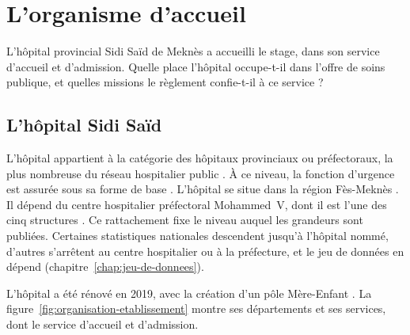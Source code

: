 
\chapter{L'organisme d'accueil}\label{chap:organisme}

L'hôpital provincial Sidi Saïd de Meknès a accueilli le stage, dans son service d'accueil et
d'admission. Quelle place l'hôpital occupe-t-il dans l'offre de soins publique, et quelles missions
le règlement confie-t-il à ce service ?

\section{L'hôpital Sidi Saïd}

L'hôpital appartient à la catégorie des hôpitaux provinciaux ou préfectoraux, la plus nombreuse du
réseau hospitalier public \cite[tableau~32, p.~46]{s30}. À ce niveau, la fonction d'urgence est
assurée sous sa forme de base \cite{s12}. L'hôpital se situe dans la région Fès-Meknès \cite{s05}.
Il dépend du centre hospitalier préfectoral Mohammed~V, dont il est l'une des cinq structures
\cite{s20, s29}. Ce rattachement fixe le niveau auquel les grandeurs sont publiées. Certaines
statistiques nationales descendent jusqu'à l'hôpital nommé, d'autres s'arrêtent au centre
hospitalier ou à la préfecture, et le jeu de données en dépend (chapitre~\ref{chap:jeu-de-donnees}).

L'hôpital a été rénové en 2019, avec la création d'un pôle Mère-Enfant \cite{s29}. La
figure~\ref{fig:organisation-etablissement} montre ses départements et ses services, dont le service
d'accueil et d'admission.

